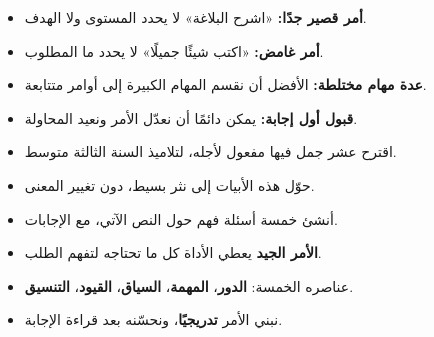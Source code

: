 \documentclass[a4paper]{article}
\newcommand{\kalima}[2][]{\textbf{#2}}
\begin{document}
\begin{intabih}
\begin{itemize}
    \item \textbf{أمر قصير جدًا:} «اشرح البلاغة» لا يحدد المستوى ولا الهدف.
    \item \textbf{أمر غامض:} «اكتب شيئًا جميلًا» لا يحدد ما المطلوب.
    \item \textbf{عدة مهام مختلطة:} الأفضل أن نقسم المهام الكبيرة إلى أوامر متتابعة.
    \item \textbf{قبول أول إجابة:} يمكن دائمًا أن نعدّل الأمر ونعيد المحاولة.
\end{itemize}
\end{intabih}

\begin{arabiyya}
\begin{itemize}
    \item اقترح عشر جمل فيها مفعول لأجله، لتلاميذ السنة الثالثة متوسط.
    \item حوّل هذه الأبيات إلى نثر بسيط، دون تغيير المعنى.
    \item أنشئ خمسة أسئلة فهم حول النص الآتي، مع الإجابات.
\end{itemize}
\end{arabiyya}

\begin{khulasa}
\begin{itemize}
    \item \textbf{الأمر الجيد} يعطي الأداة كل ما تحتاجه لتفهم الطلب.
    \item عناصره الخمسة: \kalima{الدور}، \kalima[akhdar]{المهمة}،
          \kalima[burtuqali]{السياق}، \kalima[ahmar]{القيود}، \kalima[banafsaji]{التنسيق}.
    \item نبني الأمر \textbf{تدريجيًا}، ونحسّنه بعد قراءة الإجابة.
\end{itemize}
\end{khulasa}
\end{document}
